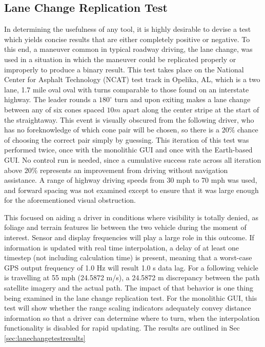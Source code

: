 \subsection{Lane Change Replication Test} \label{sec:lanechangetest}
In determining the usefulness of any tool, it is highly desirable to devise a test which yields concise results that are either completely positive or negative. To this end, a maneuver common in typical roadway driving, the lane change, was used in a situation in which the maneuver could be replicated properly or improperly to produce a binary result. This test takes place on the National Center for Asphalt Technology (NCAT) test track in Opelika, AL, which is a two lane, 1.7 mile oval oval with turns comparable to those found on an interstate highway. The leader rounds a $180^\circ$ turn and upon exiting makes a lane change between any of six cones spaced $10m$ apart along the center stripe at the start of the straightaway. This event is visually obscured from the following driver, who has no foreknowledge of which cone pair will be chosen, so there is a $20\%$ chance of choosing the correct pair simply by guessing. This iteration of this test was performed twice, once with the monolithic GUI and once with the Earth-based GUI. No control run is needed, since a cumulative success rate across all iteration above $20\%$ represents an improvement from driving without navigation assistance. A range of highway driving speeds from 30 mph to 70 mph was used, and forward spacing was not examined except to ensure that it was large enough for the aforementioned visual obstruction.

This focused on aiding a driver in conditions where visibility is totally denied, as foliage and terrain features lie between the two vehicle during the moment of interest. Sensor and display frequencies will play a large role in this outcome. If information is updated with real time interpolation, a delay of at least one timestep (not including calculation time) is present, meaning that a worst-case GPS output frequency of 1.0 Hz will result 1.0 s data lag. For a following vehicle is travelling at 55 mph (24.5872 m/s), a 24.5872 m discrepancy between the path satellite imagery and the actual path. The impact of that behavior is one thing being examined in the lane change replication test. For the monolithic GUI, this test will show whether the range scaling indicators adequately convey distance information so that a driver can determine where to turn, when the interpolation functionality is disabled for rapid updating. The results are outlined in Sec \ref{sec:lanechangetestresults}


